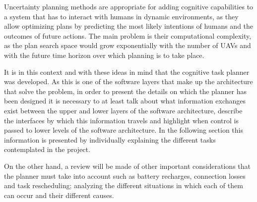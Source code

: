 Uncertainty planning methods are appropriate for adding cognitive capabilities to a system that has to interact with humans in dynamic environments, as they allow optimizing plans by predicting the most likely intentions of humans and the outcomes of future actions. The main problem is their computational complexity, as the plan search space would grow exponentially with the number of \glspl{UAV} and with the future time horizon over which planning is to take place.

It is in this context and with these ideas in mind that the cognitive task planner was developed. As this is one of the software layers that make up the architecture that solve the problem, in order to present the details on which the planner has been designed it is necessary to at least talk about what information exchanges exist between the upper and lower layers of the software architecture, describe the interfaces by which this information travels and highlight when control is passed to lower levels of the software architecture. In the following section this information is presented by individually explaining the different tasks contemplated in the project. 

On the other hand, a review will be made of other important considerations that the planner must take into account such as battery recharges, connection losses and task rescheduling; analyzing the different situations in which each of them can occur and their different causes. 

